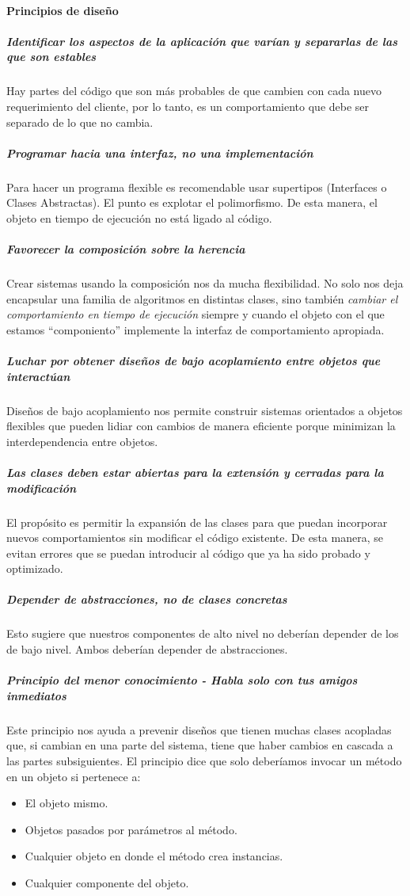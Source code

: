 \paragraph{Principios de diseño}
\subparagraph{Identificar los aspectos de la aplicación que varían y separarlas de las que son estables}
Hay partes del código que son más probables de que cambien con cada nuevo requerimiento del cliente, por lo tanto, es un comportamiento que debe ser separado de lo que no cambia.
\subparagraph{Programar hacia una interfaz, no una implementación}
Para hacer un programa flexible es recomendable usar supertipos (Interfaces o Clases Abstractas). El punto es explotar el polimorfismo. De esta manera, el objeto en tiempo de ejecución no está ligado al código.
\subparagraph{Favorecer la composición sobre la herencia}
Crear sistemas usando la composición nos da mucha flexibilidad. No solo nos deja encapsular una familia de algoritmos en distintas clases, sino también \emph{cambiar el comportamiento en tiempo de ejecución} siempre y cuando el objeto con el que estamos ``componiento'' implemente la interfaz de comportamiento apropiada.
\subparagraph{\emph{Luchar} por obtener diseños de bajo acoplamiento entre objetos que interactúan}
Diseños de bajo acoplamiento nos permite construir sistemas orientados a objetos flexibles que pueden lidiar con cambios de manera eficiente porque minimizan la interdependencia entre objetos.
\subparagraph{Las clases deben estar abiertas para la extensión y cerradas para la modificación}
El propósito es permitir la expansión de las clases para que puedan incorporar nuevos comportamientos sin modificar el código existente. De esta manera, se evitan errores que se puedan introducir al código que ya ha sido probado y optimizado.
\subparagraph{Depender de abstracciones, no de clases concretas}
Esto sugiere que nuestros componentes de alto nivel no deberían depender de los de bajo nivel. Ambos deberían depender de abstracciones.
\subparagraph{Principio del menor conocimiento - Habla solo con tus amigos inmediatos}
Este principio nos ayuda a prevenir diseños que tienen muchas clases acopladas que, si cambian en una parte del sistema, tiene que haber cambios en cascada a las partes subsiguientes. El principio dice que solo deberíamos invocar un método en un objeto si pertenece a:
\begin{itemize}
\item El objeto mismo.
\item Objetos pasados por parámetros al método.
\item Cualquier objeto en donde el método crea instancias.
\item Cualquier componente del objeto.
\end{itemize}
